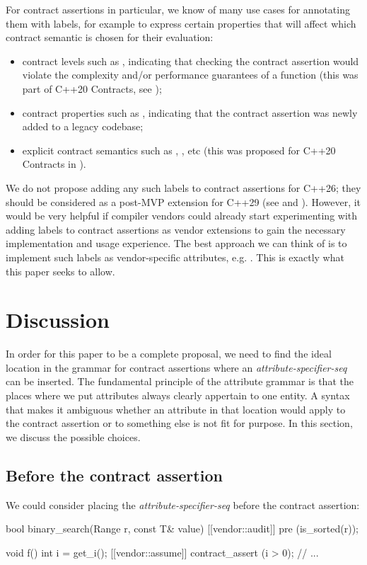For contract assertions in particular, we know of many use cases for annotating them with labels, for example to express certain properties that will affect which contract semantic is chosen for their evaluation:
\begin{itemize}
\item contract levels such as , indicating that checking the contract assertion would violate the complexity and/or performance guarantees of a function (this was part of C++20 Contracts, see \cite{P0542R5});
\item contract properties such as , indicating that the contract assertion was newly added to a legacy codebase;
\item explicit contract semantics such as , , etc (this was proposed for C++20 Contracts in \cite{P1429R3}).
\end{itemize}

We do not propose adding any such labels to contract assertions for C++26; they should be considered as a post-MVP extension for C++29 (see \cite{P2755R0} and \cite{P2885R3}). However, it would be very helpful if compiler vendors could already start experimenting with adding labels to contract assertions as vendor extensions to gain the necessary implementation and usage experience. The best approach we can think of is to implement such labels as vendor-specific attributes, e.g. . This is exactly what this paper seeks to allow.

\section{Discussion}

In order for this paper to be a complete proposal, we need to find the ideal location in the grammar for contract assertions where an \emph{attribute-specifier-seq} can be inserted. The fundamental principle of the attribute grammar is that the places where we put attributes always clearly appertain to one entity. A syntax that makes it ambiguous whether an attribute in that location would apply to the contract  assertion or to something else is not fit for purpose. In this section, we discuss the possible choices.

\subsection{Before the contract assertion}

We could consider placing the \emph{attribute-specifier-seq} before the contract assertion:
\begin{codeblock}
bool binary_search(Range r, const T& value)
  [[vendor::audit]] pre (is_sorted(r));
  
void f() {
  int i = get_i();
  [[vendor::assume]] contract_assert (i > 0);
  // ...
}
\end{codeblock}


